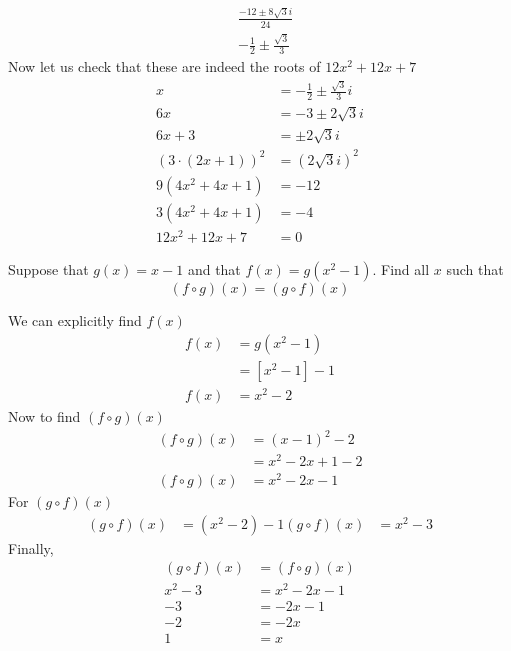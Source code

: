 \begin{solution}
\begin{enumerate}[label=\textbf{\roman*)}]
\begin{align*}
        & \frac{-12 \pm 8 \sqrt{3}i}{24} \\
        & - \frac{1}{2} \pm \frac{\sqrt{3}}{3}
      \end{align*}
      Now let us check that these are indeed the roots of \( 12x^{2} + 12x +7 \)
      \begin{align*}
        x &=  -\frac{1}{2} \pm \frac{\sqrt{3}}{3} i \\
        6x &= -3 \pm 2 \sqrt{3} i\\
        6x+3 &= \pm 2\sqrt{3}i \\
        \left( 3 \cdot \left( 2x +1 \right) \right)^{2} &= \left( 2\sqrt{3}i \right)^{2} \\
        9 \left( 4x^{2} + 4x +1\right) &= -12 \\
        3 \left( 4x^{2} + 4x +1\right) &= -4\\
        12 x^{2} + 12x + 7 &= 0
      \end{align*}
      
    \end{enumerate}
\end{solution}

\begin{exercise}
  Suppose that \( g(x) =x-1 \) and that \( f(x) = g(x^{2}-1) \). Find all \( x \) such that 
  \[ \left( f \circ g \right)(x) = \left( g \circ f  \right)(x) \]
\end{exercise}
\begin{solution}
    We can explicitly find \( f(x) \) 
    \begin{align*}
          f(x) &= g(x^{2}-1) \\
          &= \left[ x^{2}-1 \right]-1 \\
          f(x) &= x^{2} -2
    \end{align*}
    Now to find \( \left( f \circ g \right)(x) \)
    \begin{align*}
      \left( f \circ g \right)(x)  &= \left( x-1 \right)^{2} -2\\
      &= x^{2}-2x+1 -2 \\
      \left( f \circ g \right)(x) &= x^{2}-2x-1
    \end{align*}
    For \( \left( g \circ f \right)(x) \) 
    \begin{align*}
       \left( g \circ f \right)(x)  &= \left( x^{2}-2 \right)-1 
        \left( g \circ f \right)(x) &= x^{2}-3
    \end{align*}
    Finally, 
    \begin{align*}
       \left( g \circ f \right)(x)  &=  \left( f \circ g \right)(x) \\
       x^{2}-3 &= x^{2}-2x-1 \\
       -3 &=-2x -1 \\
       -2 &= -2x \\
       1 &= x
    \end{align*}
    
\end{solution}

